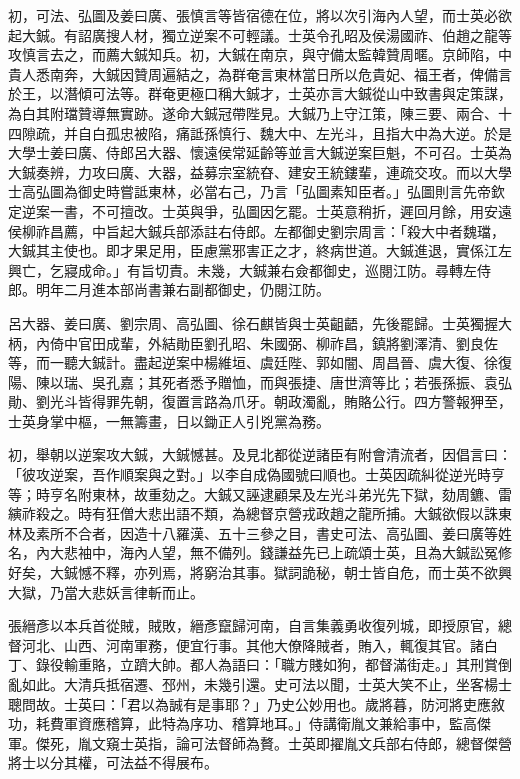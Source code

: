 \begin{pinyinscope}
初，可法、弘圖及姜曰廣、張慎言等皆宿德在位，將以次引海內人望，而士英必欲起大鋮。有詔廣搜人材，獨立逆案不可輕議。士英令孔昭及侯湯國祚、伯趙之龍等攻慎言去之，而薦大鋮知兵。初，大鋮在南京，與守備太監韓贊周暱。京師陷，中貴人悉南奔，大鋮因贊周遍結之，為群奄言東林當日所以危貴妃、福王者，俾備言於王，以潛傾可法等。群奄更極口稱大鋮才，士英亦言大鋮從山中致書與定策謀，為白其附璫贊導無實跡。遂命大鋮冠帶陛見。大鋮乃上守江策，陳三要、兩合、十四隙疏，并自白孤忠被陷，痛詆孫慎行、魏大中、左光斗，且指大中為大逆。於是大學士姜曰廣、侍郎呂大器、懷遠侯常延齡等並言大鋮逆案巨魁，不可召。士英為大鋮奏辨，力攻曰廣、大器，益募宗室統昚、建安王統鏤輩，連疏交攻。而以大學士高弘圖為御史時嘗詆東林，必當右己，乃言「弘圖素知臣者。」弘圖則言先帝欽定逆案一書，不可擅改。士英與爭，弘圖因乞罷。士英意稍折，遲回月餘，用安遠侯柳祚昌薦，中旨起大鋮兵部添註右侍郎。左都御史劉宗周言：「殺大中者魏璫，大鋮其主使也。即才果足用，臣慮黨邪害正之才，終病世道。大鋮進退，實係江左興亡，乞寢成命。」有旨切責。未幾，大鋮兼右僉都御史，巡閱江防。尋轉左侍郎。明年二月進本部尚書兼右副都御史，仍閱江防。

呂大器、姜曰廣、劉宗周、高弘圖、徐石麒皆與士英齟齬，先後罷歸。士英獨握大柄，內倚中官田成輩，外結勛臣劉孔昭、朱國弼、柳祚昌，鎮將劉澤清、劉良佐等，而一聽大鋮計。盡起逆案中楊維垣、虞廷陛、郭如闇、周昌晉、虞大復、徐復陽、陳以瑞、吳孔嘉；其死者悉予贈恤，而與張捷、唐世濟等比；若張孫振、袁弘勛、劉光斗皆得罪先朝，復置言路為爪牙。朝政濁亂，賄賂公行。四方警報狎至，士英身掌中樞，一無籌畫，日以鋤正人引兇黨為務。

初，舉朝以逆案攻大鋮，大鋮憾甚。及見北都從逆諸臣有附會清流者，因倡言曰：「彼攻逆案，吾作順案與之對。」以李自成偽國號曰順也。士英因疏糾從逆光時亨等；時亨名附東林，故重劾之。大鋮又誣逮顧杲及左光斗弟光先下獄，劾周鑣、雷縯祚殺之。時有狂僧大悲出語不類，為總督京營戎政趙之龍所捕。大鋮欲假以誅東林及素所不合者，因造十八羅漢、五十三參之目，書史可法、高弘圖、姜曰廣等姓名，內大悲袖中，海內人望，無不備列。錢謙益先已上疏頌士英，且為大鋮訟冤修好矣，大鋮憾不釋，亦列焉，將窮治其事。獄詞詭秘，朝士皆自危，而士英不欲興大獄，乃當大悲妖言律斬而止。

張縉彥以本兵首從賊，賊敗，縉彥竄歸河南，自言集義勇收復列城，即授原官，總督河北、山西、河南軍務，便宜行事。其他大僚降賊者，賄入，輒復其官。諸白丁、錄役輸重賂，立躋大帥。都人為語曰：「職方賤如狗，都督滿街走。」其刑賞倒亂如此。大清兵抵宿遷、邳州，未幾引還。史可法以聞，士英大笑不止，坐客楊士聰問故。士英曰：「君以為誠有是事耶？」乃史公妙用也。歲將暮，防河將吏應敘功，耗費軍資應稽算，此特為序功、稽算地耳。」侍講衛胤文兼給事中，監高傑軍。傑死，胤文窺士英指，論可法督師為贅。士英即擢胤文兵部右侍郎，總督傑營將士以分其權，可法益不得展布。


\end{pinyinscope}
